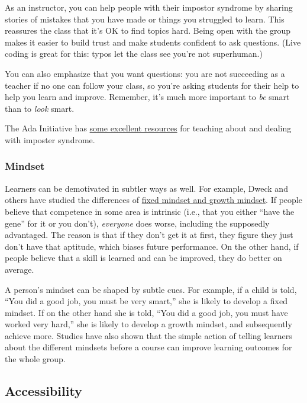 As an instructor, you can help people with their impostor syndrome by
sharing stories of mistakes that you have made or things you struggled
to learn. This reassures the class that it's OK to find topics hard.
Being open with the group makes it easier to build trust and make
students confident to ask questions. (Live coding is great for this:
typos let the class see you're not superhuman.)

You can also emphasize that you want questions: you are not succeeding
as a teacher if no one can follow your class, so you're asking students
for their help to help you learn and improve. Remember, it's much more
important to \emph{be} smart than to \emph{look} smart.

The Ada Initiative has
\href{http://adainitiative.org/continue-our-work/impostor-syndrome-training/}{some
excellent resources} for teaching about and dealing with imposter
syndrome.

\subsubsection{Mindset}\label{mindset}

Learners can be demotivated in subtler ways as well. For example, Dweck
and others have studied the differences of
\href{https://en.wikipedia.org/wiki/Mindset\#Fixed_mindset_and_growth_mindset}{fixed
mindset and growth mindset}. If people believe that competence in some
area is intrinsic (i.e., that you either ``have the gene'' for it or you
don't), \emph{everyone} does worse, including the supposedly advantaged.
The reason is that if they don't get it at first, they figure they just
don't have that aptitude, which biases future performance. On the other
hand, if people believe that a skill is learned and can be improved,
they do better on average.

A person's mindset can be shaped by subtle cues. For example, if a child
is told, ``You did a good job, you must be very smart,'' she is likely
to develop a fixed mindset. If on the other hand she is told, ``You did
a good job, you must have worked very hard,'' she is likely to develop a
growth mindset, and subsequently achieve more. Studies have also shown
that the simple action of telling learners about the different mindsets
before a course can improve learning outcomes for the whole group.

\subsection{Accessibility}\label{accessibility}

